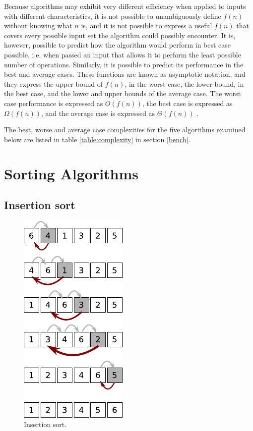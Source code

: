 \documentclass[12pt, a4paper]{article}
\begin{document}
Because algorithms may exhibit very different efficiency when applied to inputs with different characteristics, it is not possible to unambiguously define $f(n)$ without knowing what $n$ is, and it is not possible to express a useful $f(n)$ that covers every possible input set the algorithm could possibly encounter. It is, however, possible to predict how the algorithm would perform in best case possible, i.e. when passed an input that allows it to perform the least possible number of operations. Similarly, it is possible to predict its performance in the best and average cases. These functions are known as asymptotic notation, and they express the upper bound of $f(n)$, in the worst case, the lower bound, in the best case, and the lower and upper bounds of the average case. The worst case performance is expressed as $O(f(n))$, the best case is expressed as $\Omega(f(n))$, and the average case is expressed as $\Theta(f(n))$ \autocite[18]{heineman2016algorithms}.

The best, worse and average case complexities for the five algorithms examined below are listed in table \ref{table:complexity} in section \ref{bench}.

\section{Sorting Algorithms}

\subsection{Insertion sort}\label{sec:insertion}


\begin{figure}
    \centering
    \includegraphics{insertion_sort.pdf}
    \caption{\label{fig:insertion_sort}Insertion sort.}
\end{figure}
\end{document}
